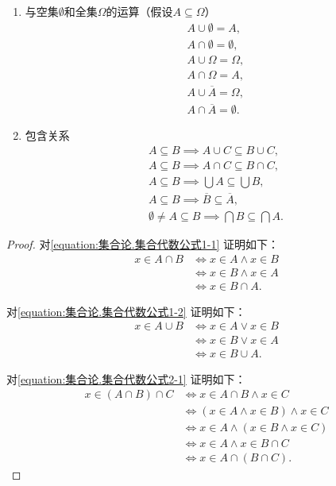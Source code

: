 \begin{property}
\begin{enumerate}
\item 与空集\(\emptyset\)和全集\(\Omega\)的运算（假设\(A \subseteq \Omega\)）
\begin{gather}
	A \cup \emptyset = A, \label{equation:集合论.集合代数公式5-1} \\
	A \cap \emptyset = \emptyset, \label{equation:集合论.集合代数公式5-2} \\
	A \cup \Omega = \Omega, \label{equation:集合论.集合代数公式5-3} \\
	A \cap \Omega = A, \label{equation:集合论.集合代数公式5-4} \\
	A \cup \overline{A} = \Omega, \label{equation:集合论.集合代数公式5-5} \\
	A \cap \overline{A} = \emptyset. \label{equation:集合论.集合代数公式5-6}
\end{gather}

\item 包含关系
\begin{gather}
	A \subseteq B \implies A \cup C \subseteq B \cup C, \label{equation:集合论.集合代数公式6-1} \\
	A \subseteq B \implies A \cap C \subseteq B \cap C, \label{equation:集合论.集合代数公式6-2} \\
	A \subseteq B \implies \bigcup A \subseteq \bigcup B, \label{equation:集合论.集合代数公式6-3} \\
	A \subseteq B \implies \overline{B} \subseteq \overline{A}, \label{equation:集合论.集合代数公式6-4} \\
	\emptyset \neq A \subseteq B \implies \bigcap B \subseteq \bigcap A. \label{equation:集合论.集合代数公式6-5}
\end{gather}
\end{enumerate}
\begin{proof}
对\cref{equation:集合论.集合代数公式1-1} 证明如下：
\begin{align*}
	x \in A \cap B
	&\iff x \in A \land x \in B \\
	&\iff x \in B \land x \in A \\
	&\iff x \in B \cap A.
\end{align*}

对\cref{equation:集合论.集合代数公式1-2} 证明如下：
\begin{align*}
	x \in A \cup B
	&\iff x \in A \lor x \in B \\
	&\iff x \in B \lor x \in A \\
	&\iff x \in B \cup A.
\end{align*}

对\cref{equation:集合论.集合代数公式2-1} 证明如下：
\begin{align*}
	x \in (A \cap B) \cap C
	&\iff x \in A \cap B \land x \in C \\
	&\iff (x \in A \land x \in B) \land x \in C \\
	&\iff x \in A \land (x \in B \land x \in C) \\
	&\iff x \in A \land x \in B \cap C \\
	&\iff x \in A \cap (B \cap C).
\end{align*}


\end{proof}
\end{property}
